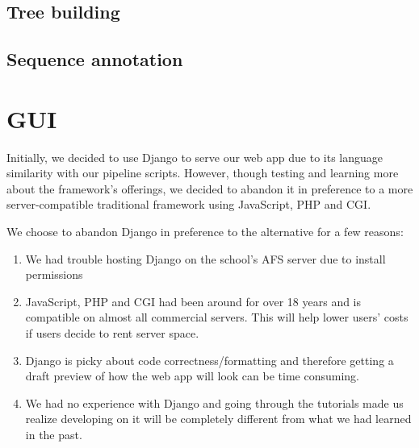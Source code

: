 \documentclass[12pt]{article}
\newcommand{\tab}{\hspace*{3em}}
\begin{document}
\subsection{Tree building}

\subsection{Sequence annotation}


\section{GUI}
\tab Initially, we decided to use Django to serve our web app due to its language similarity with our pipeline scripts. However, though testing and learning more about the framework's offerings, we decided to abandon it in preference to a more server-compatible traditional framework using JavaScript, PHP and CGI.\\
\bigskip

We choose to abandon Django in preference to the alternative for a few reasons:
\begin{enumerate}
	\item We had trouble hosting Django on the school's AFS server due to install permissions
	\item JavaScript, PHP and CGI had been around for over 18 years and is compatible on almost all commercial servers. This will help lower users' costs if users decide to rent server space.
	\item Django is picky about code correctness/formatting and therefore getting a draft preview of how the web app will look can be time consuming.
	\item We had no experience with Django and going through the tutorials made us realize developing on it will be completely different from what we had learned in the past.
\end{enumerate}
\end{document}
